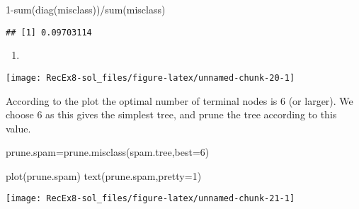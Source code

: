 \documentclass[
]{article}
\newenvironment{Shaded}{\begin{snugshade}}{\end{snugshade}}
\newcommand{\AttributeTok}[1]{\textcolor[rgb]{0.77,0.63,0.00}{#1}}
\newcommand{\DecValTok}[1]{\textcolor[rgb]{0.00,0.00,0.81}{#1}}
\newcommand{\FunctionTok}[1]{\textcolor[rgb]{0.00,0.00,0.00}{#1}}
\newcommand{\NormalTok}[1]{#1}
\newcommand{\OtherTok}[1]{\textcolor[rgb]{0.56,0.35,0.01}{#1}}
\newcommand{\SpecialCharTok}[1]{\textcolor[rgb]{0.00,0.00,0.00}{#1}}
\newcommand{\StringTok}[1]{\textcolor[rgb]{0.31,0.60,0.02}{#1}}
\providecommand{\tightlist}{%
  \setlength{\itemsep}{0pt}\setlength{\parskip}{0pt}}
\begin{document}
\begin{Shaded}
\begin{Highlighting}[]
\DecValTok{1}\SpecialCharTok{{-}}\FunctionTok{sum}\NormalTok{(}\FunctionTok{diag}\NormalTok{(misclass))}\SpecialCharTok{/}\FunctionTok{sum}\NormalTok{(misclass)}
\end{Highlighting}
\end{Shaded}

\begin{verbatim}
## [1] 0.09703114
\end{verbatim}

\begin{enumerate}
\def\labelenumi{\alph{enumi})}
\setcounter{enumi}{4}
\tightlist
\item
\end{enumerate}

\begin{Shaded}
\end{Shaded}

\texttt{[image: RecEx8-sol\_files/figure-latex/unnamed-chunk-20-1]}

According to the plot the optimal number of terminal nodes is 6 (or
larger). We choose 6 as this gives the simplest tree, and prune the tree
according to this value.

\begin{Shaded}
\begin{Highlighting}[]
\NormalTok{prune.spam}\OtherTok{=}\FunctionTok{prune.misclass}\NormalTok{(spam.tree,}\AttributeTok{best=}\DecValTok{6}\NormalTok{)}

\FunctionTok{plot}\NormalTok{(prune.spam)}
\FunctionTok{text}\NormalTok{(prune.spam,}\AttributeTok{pretty=}\DecValTok{1}\NormalTok{)}
\end{Highlighting}
\end{Shaded}

\texttt{[image: RecEx8-sol\_files/figure-latex/unnamed-chunk-21-1]}
\end{document}
